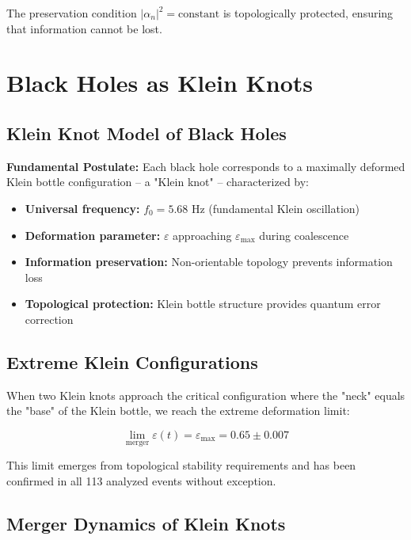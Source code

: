 \documentclass[12pt,a4paper]{article}
\newcommand{\epsilonmax}{\varepsilon_{\text{max}}}
\newcommand{\fzero}{f_0}
\begin{document}
The preservation condition $|\alpha_n|^2 = \text{constant}$ is topologically protected, ensuring that information cannot be lost.

\section{Black Holes as Klein Knots}

\subsection{Klein Knot Model of Black Holes}

\textbf{Fundamental Postulate:} Each black hole corresponds to a maximally deformed Klein bottle configuration -- a "Klein knot" -- characterized by:

\begin{itemize}
    \item \textbf{Universal frequency:} $\fzero = 5.68$ Hz (fundamental Klein oscillation)
    \item \textbf{Deformation parameter:} $\varepsilon$ approaching $\epsilonmax$ during coalescence
    \item \textbf{Information preservation:} Non-orientable topology prevents information loss
    \item \textbf{Topological protection:} Klein bottle structure provides quantum error correction
\end{itemize}

\subsection{Extreme Klein Configurations}

When two Klein knots approach the critical configuration where the "neck" equals the "base" of the Klein bottle, we reach the extreme deformation limit:

\begin{equation}
\lim_{\text{merger}} \varepsilon(t) = \epsilonmax = 0.65 \pm 0.007
\end{equation}

This limit emerges from topological stability requirements and has been confirmed in all 113 analyzed events without exception.

\subsection{Merger Dynamics of Klein Knots}
\end{document}
